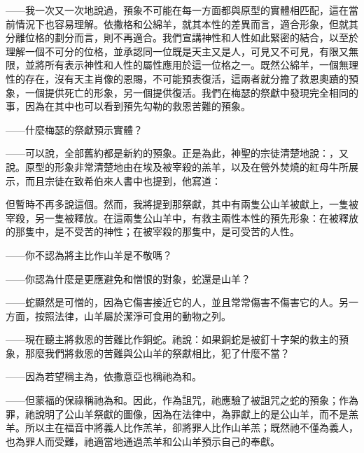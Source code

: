 ——我一次又一次地說過，預象不可能在每一方面都與原型的實體相匹配，這在當前情況下也容易理解。依撒格和公綿羊，就其本性的差異而言，適合形象，但就其分離位格的劃分而言，則不再適合。我們宣講神性和人性如此緊密的結合，以至於理解一個不可分的位格，並承認同一位既是天主又是人，可見又不可見，有限又無限，並將所有表示神性和人性的屬性應用於這一位格之一。既然公綿羊，一個無理性的存在，沒有天主肖像的恩賜，不可能預表復活，這兩者就分擔了救恩奧蹟的預象，一個提供死亡的形象，另一個提供復活。我們在梅瑟的祭獻中發現完全相同的事，因為在其中也可以看到預先勾勒的救恩苦難的預象。\par

——什麼梅瑟的祭獻預示實體？\par

——可以說，全部舊約都是新約的預象。正是為此，神聖的宗徒清楚地說：，又說。原型的形象非常清楚地由在埃及被宰殺的羔羊，以及在營外焚燒的紅母牛所展示，而且宗徒在致希伯來人書中也提到，他寫道：\par

但暫時不再多說這個。然而，我將提到那祭獻，其中有兩隻公山羊被獻上，一隻被宰殺，另一隻被釋放。在這兩隻公山羊中，有救主兩性本性的預先形象：在被釋放的那隻中，是不受苦的神性；在被宰殺的那隻中，是可受苦的人性。\par

——你不認為將主比作山羊是不敬嗎？\par

——你認為什麼是更應避免和憎恨的對象，蛇還是山羊？\par

——蛇顯然是可憎的，因為它傷害接近它的人，並且常常傷害不傷害它的人。另一方面，按照法律，山羊屬於潔淨可食用的動物之列。\par

——現在聽主將救恩的苦難比作銅蛇。祂說：如果銅蛇是被釘十字架的救主的預象，那麼我們將救恩的苦難與公山羊的祭獻相比，犯了什麼不當？\par

——因為若望稱主為，依撒意亞也稱祂為和。\par

——但蒙福的保祿稱祂為和。因此，作為詛咒，祂應驗了被詛咒之蛇的預象；作為罪，祂說明了公山羊祭獻的圖像，因為在法律中，為罪獻上的是公山羊，而不是羔羊。所以主在福音中將義人比作羔羊，卻將罪人比作山羊羔；既然祂不僅為義人，也為罪人而受難，祂適當地通過羔羊和公山羊預示自己的奉獻。\par

